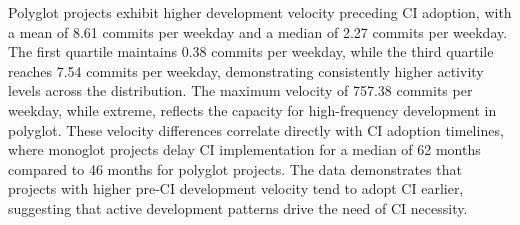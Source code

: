 \documentclass[11pt]{article}
\begin{document}
Polyglot projects exhibit higher development velocity preceding CI adoption, with a mean of 8.61 commits per weekday and a median of 2.27 commits per weekday. The first quartile maintains 0.38 commits per weekday, while the third quartile reaches 7.54 commits per weekday, demonstrating consistently higher activity levels across the distribution. The maximum velocity of 757.38 commits per weekday, while extreme, reflects the capacity for high-frequency development in polyglot. These velocity differences correlate directly with CI adoption timelines, where monoglot projects delay CI implementation for a median of 62 months compared to 46 months for polyglot projects. The data demonstrates that projects with higher pre-CI development velocity tend to adopt CI earlier, suggesting that active development patterns drive the need of CI necessity.
\end{document}

